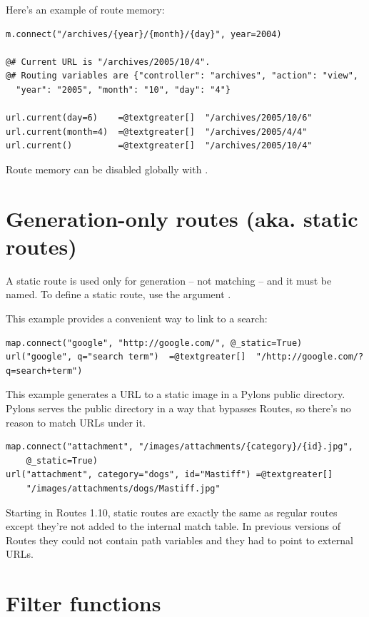 \documentclass[letterpaper,10pt,english]{manual}
\begin{document}
Here's an example of route memory:

\begin{Verbatim}[commandchars=@\[\]]
m.connect("/archives/{year}/{month}/{day}", year=2004)

@# Current URL is "/archives/2005/10/4".
@# Routing variables are {"controller": "archives", "action": "view",
  "year": "2005", "month": "10", "day": "4"}

url.current(day=6)    =@textgreater[]  "/archives/2005/10/6"
url.current(month=4)  =@textgreater[]  "/archives/2005/4/4"
url.current()         =@textgreater[]  "/archives/2005/10/4"
\end{Verbatim}

Route memory can be disabled globally with .


\section{Generation-only routes (aka. static routes)}

A static route is used only for generation -- not matching -- and it must be
named.  To define a static route, use the argument .

This example provides a convenient way to link to a search:

\begin{Verbatim}[commandchars=@\[\]]
map.connect("google", "http://google.com/", @_static=True)
url("google", q="search term")  =@textgreater[]  "/http://google.com/?q=search+term")
\end{Verbatim}

This example generates a URL to a static image in a Pylons public directory.
Pylons serves the public directory in a way that bypasses Routes, so there's no
reason to match URLs under it.

\begin{Verbatim}[commandchars=@\[\]]
map.connect("attachment", "/images/attachments/{category}/{id}.jpg",
    @_static=True)
url("attachment", category="dogs", id="Mastiff") =@textgreater[]
    "/images/attachments/dogs/Mastiff.jpg"
\end{Verbatim}

Starting in Routes 1.10, static routes are exactly the same as regular routes
except they're not added to the internal match table.  In previous versions of
Routes they could not contain path variables and they had to point to external
URLs.


\section{Filter functions}
\end{document}
